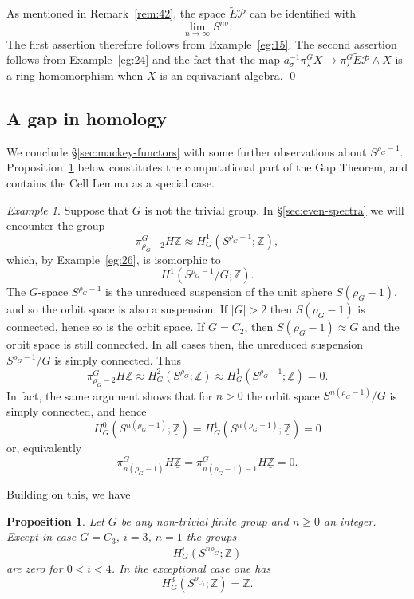 \documentclass{amsart}
\newtheorem{prop}[equation]{Proposition}
\theoremstyle{definition}
\theoremstyle{remark}
\newtheorem{eg}[equation]{Example}
\newenvironment{pf}{\bigskip{\em Proof:\/}}{\qed\medskip}
\newcommand{\Z}{{\mathbb Z}}
\newcommand{\tg}[1]{\tilde{E}#1}
\newcommand{\Zm}{\underline{\Z}}
\newcommand{\zt}{C_{2}}
\newcommand{\pfamily}{\mathcal P}
\newcommand{\tgp}{\tg{\pfamily}}
\begin{document}
\begin{pf}
As mentioned in Remark~\ref{rem:42}, the space $\tgp$ can be identified
with
\[
\lim_{n\to\infty} S^{n\sigma}.
\]
The first assertion therefore follows from Example~\ref{eg:15}.  The
second assertion follows from Example~\ref{eg:24} and the fact that
the map $a_{\sigma}^{-1}\pi^{G}_{\star}X\to \pi^{G}_{\star}\tgp\wedge
X$ is a ring homomorphism when $X$ is an equivariant algebra.
\end{pf}

\subsection{A gap in homology}
\label{sec:gap-homology}

We conclude \S\ref{sec:mackey-functors} with some further observations
about $S^{\rho_{G}-1}$.  Proposition~\ref{thm:108} below constitutes
the computational part of the Gap Theorem, and contains the Cell Lemma
as a special case.

\begin{eg}
\label{eg:8} Suppose that $G$ is not the trivial group.  In
\S\ref{sec:even-spectra} we will encounter the group
\[
\pi^{G}_{\rho_{G}-2}H\Zm \approx H^{1}_{G}(S^{\rho_{G}-1};\Zm),
\]
which, by Example~\ref{eg:26}, is isomorphic to 
\[
H^{1}(S^{\rho_{G}-1}/G;\Z).
\]
The $G$-space $S^{\rho_{G}-1}$ is the unreduced suspension of the unit
sphere $S(\rho_{G}-1)$, and so the orbit space is also a suspension.
If $|G|>2$ then $S(\rho_{G}-1)$ is connected, hence so is the orbit
space. If $G=\zt$, then $S(\rho_{G}-1)\approx G$ and the orbit space
is still connected.  In all cases then, the unreduced suspension
$S^{\rho_{G}-1}/G$ is simply connected.  Thus
\[
\pi^{G}_{\rho_{G}-2}H\Zm \approx H^{2}_{G}(S^{\rho_{G}};\Zm) \approx
H^{1}_{G}(S^{\rho_{G}-1};\Zm) = 0.
\]
In fact, the same argument shows that for $n>0$  the orbit space
$S^{n(\rho_{G}-1)}/G$ is simply connected, and hence
\[
H^{0}_{G}(S^{n(\rho_{G}-1)};\Zm) = 
H^{1}_{G}(S^{n(\rho_{G}-1)};\Zm) = 0
\]
or, equivalently
\[
\pi^{G}_{n(\rho_{G}-1)}H\Zm   = \pi^{G}_{n(\rho_{G}-1)-1}H\Zm = 0.
\]
\end{eg}

Building on this, we have

\begin{prop}
\label{thm:108}
Let $G$ be any non-trivial finite group and $n\ge 0$ an integer.
Except in case $G=C_{3}$, $i=3$, $n=1$ the groups
\[
H^{i}_{G}(S^{n\rho_{G}};\Zm)
\]
are zero for $0<i<4$.  In the exceptional case one has
\[
H^{3}_{G}(S^{\rho_{C_{3}}};\Zm) = \Z. 
\]
\end{prop}
\end{document}
